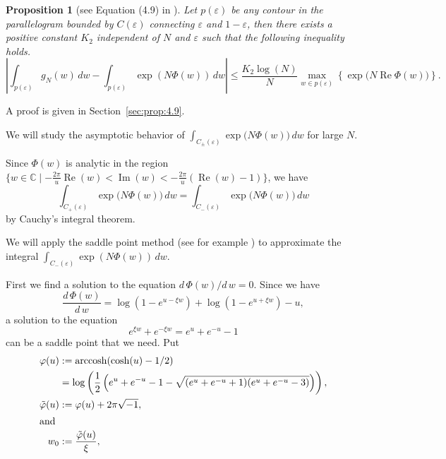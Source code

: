 \documentclass[a4paper]{amsart}
\theoremstyle{plain}
\newtheorem{prop}[thm]{Proposition}
\theoremstyle{definition}
\theoremstyle{remark}
\newcommand{\C}{\mathbb{C}}
\newcommand{\arccosh}{\operatorname{arccosh}}
\renewcommand{\Re}{\operatorname{Re}}
\renewcommand{\Im}{\operatorname{Im}}
\numberwithin{equation}{section}
\begin{document}
\begin{prop}[see Equation (4.9) in \cite{Andersen/Hansen:JKNOT2006}]
\label{prop:4.9}
Let $p(\varepsilon)$ be any contour in the parallelogram bounded by $C(\varepsilon)$ connecting $\varepsilon$ and $1-\varepsilon$, then there exists a positive constant $K_2$ independent of $N$ and $\varepsilon$ such that the following inequality holds.
\begin{equation*}
  \left|
    \int_{p(\varepsilon)}
    g_N(w)\,dw
    -
    \int_{p(\varepsilon)}
    \exp(N\Phi(w))\,dw
  \right|
  \le
  \frac{K_2\log(N)}{N}
  \max_{w\in p(\varepsilon)}\left\{\exp\bigl(N\Re\Phi(w)\bigr)\right\}.
\end{equation*}
\end{prop}
A proof is given in Section~\ref{sec:prop:4.9}.
\par
We will study the asymptotic behavior of $\int_{C_{\pm}(\varepsilon)}\exp\bigl(N\Phi(w)\bigr)\,dw$ for large $N$.
\par
Since $\Phi(w)$ is analytic in the region $\{w\in\C\mid-\frac{2\pi}{u}\Re(w)<\Im(w)<-\frac{2\pi}{u}(\Re(w)-1)\}$, we have
\begin{equation*}
  \int_{C_{+}(\varepsilon)}\exp\bigl(N\Phi(w)\bigr)\,dw
  =
  \int_{C_{-}(\varepsilon)}\exp\bigl(N\Phi(w)\bigr)\,dw
\end{equation*}
by Cauchy's integral theorem.
\par
We will apply the saddle point method (see for example \cite[\S~7.2]{Marsden/Hoffman:Complex_Analysis}) to approximate the integral $\int_{C_{-}(\varepsilon)}\exp(N\Phi(w))\,dw$.
\par
First we find a solution to the equation $d\,\Phi(w)/d\,w=0$.
Since we have
\begin{equation*}
  \frac{d\,\Phi(w)}{d\,w}
  =
  \log(1-e^{u-\xi w})+\log(1-e^{u+\xi w})-u,
\end{equation*}
a solution to the equation
\begin{equation*}
  e^{\xi w}+e^{-\xi w}
  =
  e^u+e^{-u}-1
\end{equation*}
can be a saddle point that we need.
Put
\begin{align}\label{eq:varphi}
  \varphi(u)
  &:=
  \arccosh(\cosh(u)-1/2)\notag
  \\
  &=
  \log
  \left(
    \frac{1}{2}
    \left(
      e^u+e^{-u}-1-\sqrt{(e^u+e^{-u}+1)(e^u+e^{-u}-3)}
    \right)
  \right),
  \\
  \tilde{\varphi}(u)
  &:=
  \varphi(u)+2\pi\sqrt{-1},\notag
  \\
  \intertext{and}
  w_0
  &:=
  \frac{\tilde{\varphi}(u)}{\xi},\notag
\end{align}
\end{document}
